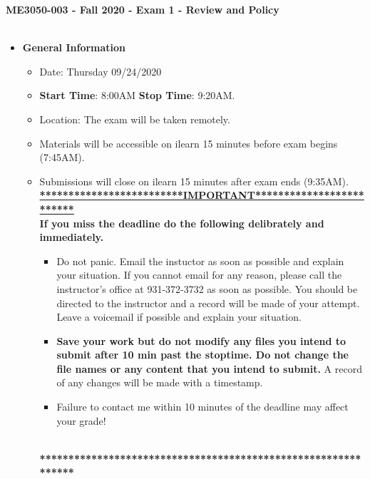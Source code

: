 \documentclass[11pt]{article}
\begin{document}
\textbf{ \LARGE ME3050-003 - Fall 2020 - Exam 1 - Review and Policy  } \\\\

\begin{itemize}
	\item  \textbf{\Large General Information}

	\begin{itemize}

		\item Date: Thursday 09/24/2020
		\item {\bf Start Time}: 8:00AM {\bf Stop Time}: 9:20AM.
		\item Location: The exam will be taken remotely. 
		 
		\item Materials will be accessible on ilearn 15 minutes before exam begins (7:45AM).
		\item Submissions will close on ilearn 15 minutes after exam ends (9:35AM). \vspace{1mm}\\
		
		{\R  \bf \underline{*************************IMPORTANT*************************}} \vspace{3mm}\\
			  {\R \bf If you miss the deadline do the following delibrately and immediately. }
		\begin{itemize}
			\item Do not panic. Email the instuctor as soon as possible and explain your situation. If you cannot email for any reason, please call the instructor's office at 931-372-3732 as soon as possible. You should be directed to the instructor and a record will be made of your attempt. Leave a voicemail if possible and explain your situation.
			\item{\bf  Save your work but do not modify any files you intend to submit after 10 min past the stoptime. Do not change the file names or any content that you intend to submit.} A record of any changes will be made with a timestamp. \vspace{2mm}
			\item {\R Failure to contact me within 10 minutes of the deadline may affect your grade!}
		\end{itemize}
			{\R  \bf \underline{\hspace{140mm}}} \\
			{\R  \bf ***************************************************************} 
	\end{itemize}


\end{itemize}
\end{document}
